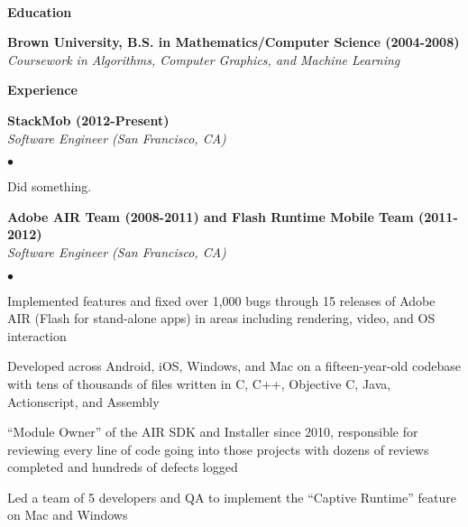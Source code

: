 \documentclass[ComputerScience]{vita}
\newenvironment{suber}[0]
{\begin{list}{$\bullet$}
	{\setlength{\topsep}{-0.4in}
		\setlength{\leftmargin}{0.25in}
		\setlength{\itemsep}{0.01in}}
}
{\end{list}\par}
\begin{document}
\topmargin=-1in
\title{}
\begin{vita}
\quad\\
{\bf {\large Education}}\ \hrulefill
\begin{list}{}{\setlength{\leftmargin}{.25in}}
\item {\bf Brown University,
	B.S. in Mathematics/Computer Science (2004-2008)}\\
	{\em Coursework in Algorithms, Computer Graphics, and Machine Learning }
\end{list}
{\bf{\large Experience}}\ \hrulefill
\begin{list}{}{\setlength{\leftmargin}{.25in}}
    \item {\bf StackMob (2012-Present)}\\
    {\em Software Engineer (San Francisco, CA)}
    \begin{suber}
	\item Did something.
    \end{suber}
    \item {\bf Adobe AIR Team (2008-2011) and Flash Runtime Mobile Team (2011-2012)}\\
    {\em Software Engineer (San Francisco, CA)}
    \begin{suber}
	\item Implemented features and fixed over 1,000 bugs through 15 releases of Adobe AIR (Flash for stand-alone apps) in areas including rendering, video, and OS interaction 
	\item Developed across  Android, iOS, Windows, and Mac on a fifteen-year-old codebase with tens of thousands of files written in C, C++, Objective C, Java, Actionscript, and Assembly
	\item ``Module Owner'' of the AIR SDK and Installer since 2010, responsible for reviewing every line of code going into those projects with dozens of reviews completed and hundreds of defects logged
	\item Led a team of 5 developers and QA to implement the ``Captive Runtime'' feature on Mac and Windows 

\end{suber}
\end{list}
\end{vita}
\end{document}
